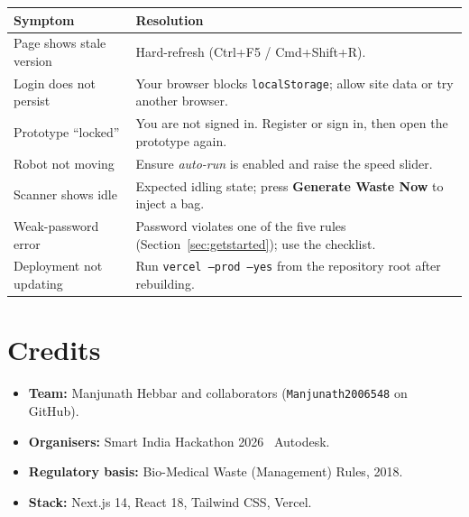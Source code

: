 \documentclass[11pt, a4paper]{article}
\begin{document}
\begin{tabularx}{\textwidth}{lX}
  \toprule
  \textbf{Symptom} & \textbf{Resolution}\\
  \midrule
  Page shows stale version & Hard-refresh (Ctrl+F5 / Cmd+Shift+R).\\
  Login does not persist & Your browser blocks \texttt{localStorage}; allow
  site data or try another browser.\\
  Prototype ``locked'' & You are not signed in. Register or sign in, then open
  the prototype again.\\
  Robot not moving & Ensure \emph{auto-run} is enabled and raise the speed
  slider.\\
  Scanner shows idle & Expected idling state; press \textbf{Generate Waste Now}
  to inject a bag.\\
  Weak-password error & Password violates one of the five rules
  (Section~\ref{sec:getstarted}); use the checklist.\\
  Deployment not updating & Run \texttt{vercel --prod --yes} from the
  repository root after rebuilding.\\
  \bottomrule
\end{tabularx}

\section{Credits}

\begin{itemize}[leftmargin=1.6em, itemsep=2pt]
  \item \textbf{Team:} Manjunath Hebbar and collaborators
        (\texttt{Manjunath2006548} on GitHub).
  \item \textbf{Organisers:} Smart India Hackathon 2026 \textperiodcentered\
        Autodesk.
  \item \textbf{Regulatory basis:} Bio-Medical Waste (Management) Rules, 2018.
  \item \textbf{Stack:} Next.js 14, React 18, Tailwind CSS, Vercel.
\end{itemize}
\end{document}
